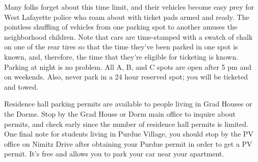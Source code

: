 Many folks forget about this time limit, and their vehicles become easy prey for West Lafayette police who roam about with ticket pads armed and ready. The pointless shuffling of vehicles from one parking spot to another amuses the neighborhood children. Note that cars are time-stamped with a swatch of chalk on one of the rear tires so that the time they've been parked in one spot is known, and, therefore, the time that they're eligible for ticketing is known. Parking at night is no problem. All A, B, and C spots are open after 5 pm and on weekends. Also, never park in a 24 hour reserved spot; you will be ticketed and towed.

Residence hall parking permits are available to people living in Grad Houses or the Dorms. Stop by the Grad House or Dorm main office to inquire about permits, and check early since the number of residence hall permits is limited. One final note for students living in Purdue Village, you should stop by the PV office on Nimitz Drive after obtaining your Purdue permit in order to get a PV permit. It's free and allows you to park your car near your apartment.
